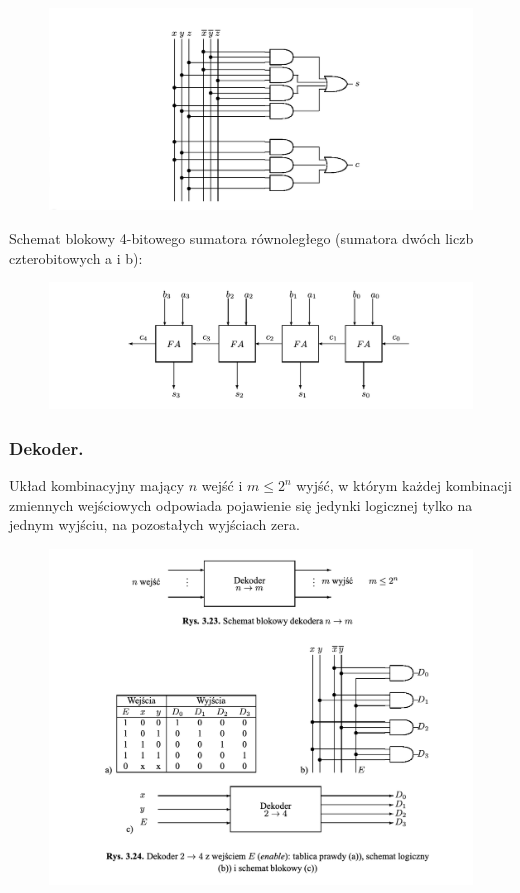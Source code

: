 \documentclass[12pt]{article}
\begin{document}
    \begin{figure}[H]
        \includegraphics[width=\linewidth]{uk/fa_l.png}
    \end{figure}

    Schemat blokowy 4-bitowego sumatora równoległego (sumatora dwóch liczb czterobitowych a i b):

    \begin{figure}[H]
        \includegraphics[width=\linewidth]{uk/fa_4.png}
    \end{figure}

    \subsubsection{Dekoder.}
    Układ kombinacyjny mający $n$ wejść i $m \leq 2^n$ wyjść, w którym każdej kombinacji zmiennych wejściowych
    odpowiada pojawienie się jedynki logicznej tylko na jednym wyjściu, na pozostałych wyjściach zera.

    \begin{figure}[H]
        \includegraphics[width=\linewidth]{uk/dek.png}
    \end{figure}
\end{document}
